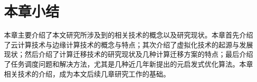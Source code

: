 \section{本章小结}\label{sec:related_work_summary}

本章主要介绍了本文研究所涉及到的相关技术的概念以及研究现状。本章首先介绍了云计算技术与边缘计算技术的概念与特点；其次介绍了虚拟化技术的起源与发展现状；然后介绍了计算迁移技术的研究现状及几种计算迁移方案的特点；最后介绍了任务调度问题和解决方法，尤其是几种近几年新提出的元启发式优化算法。本章相关技术的介绍，成为本文后续几章研究工作的基础。